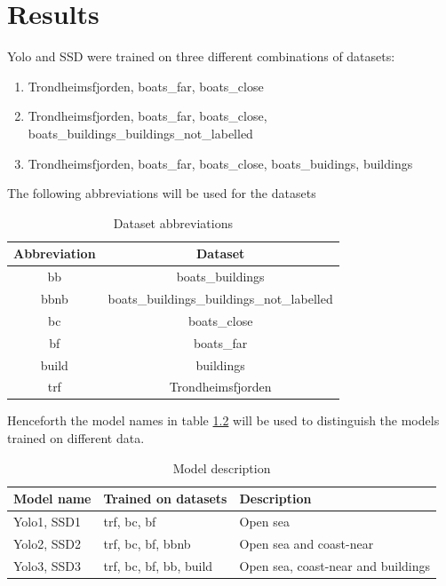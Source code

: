 \chapter{Results}

Yolo and SSD were trained on three different combinations of datasets:

\begin{enumerate}
    \item Trondheimsfjorden, boats\_far, boats\_close
    \item Trondheimsfjorden, boats\_far, boats\_close, boats\_buildings\_buildings\_not\_labelled
    \item Trondheimsfjorden, boats\_far, boats\_close, boats\_buidings, buildings
\end{enumerate}

\vspace{3mm}

The following abbreviations will be used for the datasets

\begin{table}[h!]
    \centering
    \begin{tabular}{c|c}
        Abbreviation & Dataset \\
        \hline
        bb & boats\_buildings \\
        bbnb & boats\_buildings\_buildings\_not\_labelled \\
        bc & boats\_close \\ 
        bf & boats\_far \\
        build & buildings \\
        trf & Trondheimsfjorden 
    \end{tabular}
    \caption{Dataset abbreviations}
    \label{tab:abbreviations}
\end{table}


Henceforth the model names in table \ref{tab_models} will be used to distinguish the models trained on different data.

\begin{table}[h!]
\centering
\begin{tabular}{l|ll}
Model name  & Trained on datasets    & Description                        \\ \hline
Yolo1, SSD1 & trf, bc, bf            & Open sea                           \\
Yolo2, SSD2 & trf, bc, bf, bbnb      & Open sea and coast-near            \\
Yolo3, SSD3 & trf, bc, bf, bb, build & Open sea, coast-near and buildings
\end{tabular}
\caption{Model description}
\label{tab_models}
\end{table}

